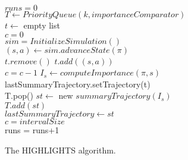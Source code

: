 

\begin{algorithm}
\SetAlFnt{\small\sf} 
\DontPrintSemicolon %
$runs = 0$ \\
$T \leftarrow PriorityQueue(k, importanceComparator)$ \\
$t \leftarrow$ empty list \\
$c = 0$ \\
 {
$sim = InitializeSimulation()$ \\
 {
$(s,a) \leftarrow sim.advanceState(\pi)$ \\
 {
$t.remove()$ 
}
$t.add((s,a))$ \\
 {
$c = c-1$
}
$I_{s} \leftarrow computeImportance(\pi,s)$ \\
 {
lastSummaryTrajectory.setTrajectory(t) \\
}
 {
 {
T.pop()
}
$st\leftarrow$ new $summaryTrajectory(I_{s})$ \\
$T.add(st)$ \\
$lastSummaryTrajectory \leftarrow st$ \\
$c = intervalSize$ \\
}
}
runs = runs+1
}
\caption{The HIGHLIGHTS algorithm. }
\label{alg:highlights}
\end{algorithm}

